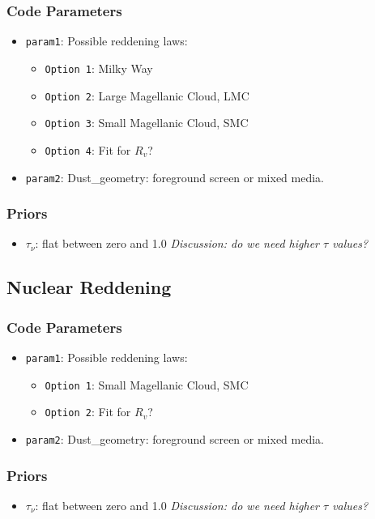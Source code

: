 \documentclass[12pt,letterpaper]{article}
\begin{document}
\subsubsection*{Code Parameters}
\begin{itemize}
    \item {\tt param1}: Possible reddening laws:
    \begin{itemize}
      \item {\tt Option 1}: Milky Way
      \item {\tt Option 2}: Large Magellanic Cloud, LMC
      \item {\tt Option 3}: Small Magellanic Cloud, SMC
      \item {\tt Option 4}: Fit for $R_v$?
    \end{itemize}
    \item {\tt param2}: Dust\_geometry: foreground screen or mixed media.
\end{itemize}

\subsubsection*{Priors}
  \begin{itemize}
   \item {\tt $\tau_{\nu}$}: flat between zero and 1.0 \textit{Discussion: do we need higher $\tau$ values?}
  \end{itemize}

\subsection*{Nuclear Reddening}

\subsubsection*{Code Parameters}
\begin{itemize}
    \item {\tt param1}: Possible reddening laws:
    \begin{itemize}
      \item {\tt Option 1}: Small Magellanic Cloud, SMC
      \item {\tt Option 2}: Fit for $R_v$?
    \end{itemize}
    \item {\tt param2}: Dust\_geometry: foreground screen or mixed media.
\end{itemize}

\subsubsection*{Priors}
  \begin{itemize}
   \item {\tt $\tau_{\nu}$}: flat between zero and 1.0 \textit{Discussion: do we need higher $\tau$ values?}
  \end{itemize}
\end{document}
